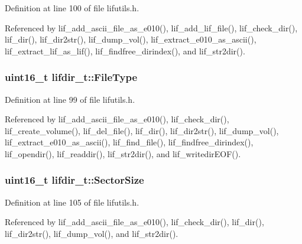 Definition at line 100 of file lifutils.\+h.



Referenced by lif\+\_\+add\+\_\+ascii\+\_\+file\+\_\+as\+\_\+e010(), lif\+\_\+add\+\_\+lif\+\_\+file(), lif\+\_\+check\+\_\+dir(), lif\+\_\+dir(), lif\+\_\+dir2str(), lif\+\_\+dump\+\_\+vol(), lif\+\_\+extract\+\_\+e010\+\_\+as\+\_\+ascii(), lif\+\_\+extract\+\_\+lif\+\_\+as\+\_\+lif(), lif\+\_\+findfree\+\_\+dirindex(), and lif\+\_\+str2dir().

\subsubsection[{\texorpdfstring{File\+Type}{FileType}}]{\setlength{\rightskip}{0pt plus 5cm}uint16\+\_\+t lifdir\+\_\+t\+::\+File\+Type}\hypertarget{structlifdir__t_a7a93a706ac4bb88f65826619c9b02231}{}\label{structlifdir__t_a7a93a706ac4bb88f65826619c9b02231}


Definition at line 99 of file lifutils.\+h.



Referenced by lif\+\_\+add\+\_\+ascii\+\_\+file\+\_\+as\+\_\+e010(), lif\+\_\+check\+\_\+dir(), lif\+\_\+create\+\_\+volume(), lif\+\_\+del\+\_\+file(), lif\+\_\+dir(), lif\+\_\+dir2str(), lif\+\_\+dump\+\_\+vol(), lif\+\_\+extract\+\_\+e010\+\_\+as\+\_\+ascii(), lif\+\_\+find\+\_\+file(), lif\+\_\+findfree\+\_\+dirindex(), lif\+\_\+opendir(), lif\+\_\+readdir(), lif\+\_\+str2dir(), and lif\+\_\+writedir\+E\+O\+F().

\subsubsection[{\texorpdfstring{Sector\+Size}{SectorSize}}]{\setlength{\rightskip}{0pt plus 5cm}uint16\+\_\+t lifdir\+\_\+t\+::\+Sector\+Size}\hypertarget{structlifdir__t_adf3c38eecddce15925157383ff38ef2d}{}\label{structlifdir__t_adf3c38eecddce15925157383ff38ef2d}


Definition at line 105 of file lifutils.\+h.



Referenced by lif\+\_\+add\+\_\+ascii\+\_\+file\+\_\+as\+\_\+e010(), lif\+\_\+check\+\_\+dir(), lif\+\_\+dir(), lif\+\_\+dir2str(), lif\+\_\+dump\+\_\+vol(), and lif\+\_\+str2dir().

